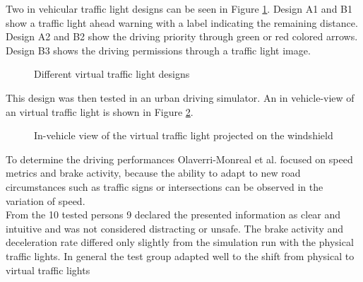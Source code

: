 \documentclass{sig-alternate}
\begin{document}
Two in vehicular traffic light designs can be seen in Figure \ref{fig:trafficlight1}. Design A1 and B1 show a traffic light ahead warning with a label indicating the remaining distance. Design A2 and B2 show the driving priority through green or red colored arrows. Design B3 shows the driving permissions through a traffic light image. 
\begin{figure} 
\centering
{}
\caption{Different virtual traffic light designs}
\label{fig:trafficlight1}
\end{figure}
This design was then tested in an urban driving simulator. An in vehicle-view of an virtual traffic light is shown in Figure \ref{fig:trafficlight2}.
\begin{figure} 
\centering
{}
\caption{In-vehicle view of the virtual traffic light projected on the windshield}
\label{fig:trafficlight2}
\end{figure}
To determine the driving performances Olaverri-Monreal et al. focused on speed metrics and brake activity, because the ability to adapt to new road circumstances such as traffic signs or intersections can be observed in the variation of speed. \\ From the 10 tested persons 9 declared the presented information as clear and intuitive and was not considered distracting or unsafe. The brake activity and deceleration rate differed only slightly from the simulation run with the physical traffic lights. In general the test group adapted well to the shift from physical to virtual traffic lights\\
\end{document}
